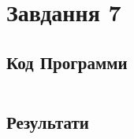 \section{Завдання 7}
\label{sec:task7}

\subsection{Код Программи}
\label{subsec:task7_code}
\inputminted{python}{../src/task7.py}

\subsection{Результати}
\label{subsec:task7_results}
